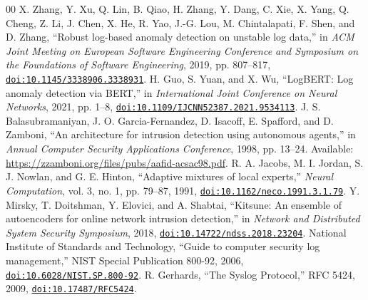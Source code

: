 \documentclass[conference]{IEEEtran}
\newcommand{\doiurl}[1]{\href{https://doi.org/#1}{\nolinkurl{doi:#1}}}
\begin{document}
\begin{thebibliography}{00}
 X. Zhang, Y. Xu, Q. Lin, B. Qiao, H. Zhang, Y. Dang, C. Xie, X. Yang, Q. Cheng, Z. Li, J. Chen, X. He, R. Yao, J.-G. Lou, M. Chintalapati, F. Shen, and D. Zhang, ``Robust log-based anomaly detection on unstable log data,'' in \emph{ACM Joint Meeting on European Software Engineering Conference and Symposium on the Foundations of Software Engineering}, 2019, pp. 807--817, \doiurl{10.1145/3338906.3338931}.
 H. Guo, S. Yuan, and X. Wu, ``LogBERT: Log anomaly detection via BERT,'' in \emph{International Joint Conference on Neural Networks}, 2021, pp. 1--8, \doiurl{10.1109/IJCNN52387.2021.9534113}.
 J. S. Balasubramaniyan, J. O. Garcia-Fernandez, D. Isacoff, E. Spafford, and D. Zamboni, ``An architecture for intrusion detection using autonomous agents,'' in \emph{Annual Computer Security Applications Conference}, 1998, pp. 13--24. Available: \url{https://zzamboni.org/files/pubs/aafid-acsac98.pdf}.
 R. A. Jacobs, M. I. Jordan, S. J. Nowlan, and G. E. Hinton, ``Adaptive mixtures of local experts,'' \emph{Neural Computation}, vol. 3, no. 1, pp. 79--87, 1991, \doiurl{10.1162/neco.1991.3.1.79}.
 Y. Mirsky, T. Doitshman, Y. Elovici, and A. Shabtai, ``Kitsune: An ensemble of autoencoders for online network intrusion detection,'' in \emph{Network and Distributed System Security Symposium}, 2018, \doiurl{10.14722/ndss.2018.23204}.
 National Institute of Standards and Technology, ``Guide to computer security log management,'' NIST Special Publication 800-92, 2006, \doiurl{10.6028/NIST.SP.800-92}.
 R. Gerhards, ``The Syslog Protocol,'' RFC 5424, 2009, \doiurl{10.17487/RFC5424}.
\end{thebibliography}
\end{document}
